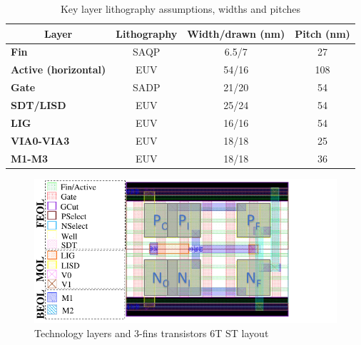 \documentclass[pgmicro,mestrado,english]{iiufrgs}
\begin{document}
\begin{table}[H]
\centering
\caption{Key layer lithography assumptions, widths and pitches}
\label{layers}
\begin{tabular}{lccc}
\hline
\multicolumn{1}{c}{\textbf{Layer}} & \textbf{Lithography} & \textbf{Width/drawn (nm)} & \textbf{Pitch (nm)} \\ \hline
\textbf{Fin}                         & SAQP                 & 6.5/7                     & 27                  \\ \hline
\textbf{Active (horizontal)}         & EUV                  & 54/16                     & 108                 \\ \hline
\textbf{Gate}                        & SADP                 & 21/20                     & 54                  \\ \hline
\textbf{SDT/LISD}                    & EUV                  & 25/24                     & 54                  \\ \hline
\textbf{LIG}                         & EUV                  & 16/16                     & 54                  \\ \hline
\textbf{VIA0-VIA3}                   & EUV                  & 18/18                     & 25                  \\ \hline
\textbf{M1-M3}                       & EUV                  & 18/18                     & 36                  \\ \hline
\end{tabular}
\end{table}

\begin{figure}[H]
\centering
\includegraphics[width=\textwidth, trim={0 0 1.5cm 0},clip]{camadasSTv2.pdf}
\caption{Technology layers and 3-fins transistors 6T ST layout}
\label{fig:layers}
\end{figure}
\end{document}
